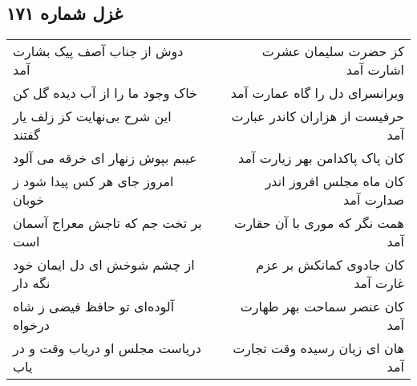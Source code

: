 \begin{center}
\section*{غزل شماره ۱۷۱}
\label{sec:sh171}
\begin{longtable}{l p{0.5cm} r}
دوش از جناب آصف پیک بشارت آمد
&&
کز حضرت سلیمان عشرت اشارت آمد
\\
خاک وجود ما را از آب دیده گل کن
&&
ویرانسرای دل را گاه عمارت آمد
\\
این شرح بی‌نهایت کز زلف یار گفتند
&&
حرفیست از هزاران کاندر عبارت آمد
\\
عیبم بپوش زنهار ای خرقه می آلود
&&
کان پاک پاکدامن بهر زیارت آمد
\\
امروز جای هر کس پیدا شود ز خوبان
&&
کان ماه مجلس افروز اندر صدارت آمد
\\
بر تخت جم که تاجش معراج آسمان است
&&
همت نگر که موری با آن حقارت آمد
\\
از چشم شوخش ای دل ایمان خود نگه دار
&&
کان جادوی کمانکش بر عزم غارت آمد
\\
آلوده‌ای تو حافظ فیضی ز شاه درخواه
&&
کان عنصر سماحت بهر طهارت آمد
\\
دریاست مجلس او دریاب وقت و در یاب
&&
هان ای زیان رسیده وقت تجارت آمد
\\
\end{longtable}
\end{center}
